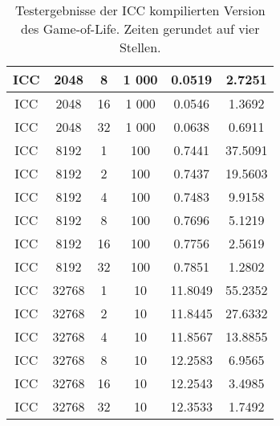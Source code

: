 \documentclass[german,plainarticle,hyperref,utf8]{zihpub}
\begin{document}
\begin{table}
\begin{center}
\begin{tabular}{||c c c c c c||}
				\hline
				ICC      & 2048  & 8         & 1 000       & 0.0519                   & 2.7251                \\
				\hline
				ICC      & 2048  & 16        & 1 000       & 0.0546                  & 1.3692                \\
				\hline
				ICC      & 2048  & 32        & 1 000       & 0.0638                  & 0.6911                \\
				\hline\hline
				ICC      & 8192  & 1         & 100         & 0.7441                   & 37.5091                \\
				\hline
				ICC      & 8192  & 2         & 100         & 0.7437                   & 19.5603                \\
				\hline
				ICC      & 8192  & 4         & 100         & 0.7483                   & 9.9158                \\
				\hline
				ICC      & 8192  & 8         & 100         & 0.7696                   & 5.1219                \\
				\hline
				ICC      & 8192  & 16        & 100         & 0.7756                   & 2.5619                \\
				\hline
				ICC      & 8192  & 32        & 100         & 0.7851                   & 1.2802                \\
				\hline\hline
				ICC      & 32768 & 1         & 10          & 11.8049                   & 55.2352                \\
				\hline
				ICC      & 32768 & 2         & 10          & 11.8445                   & 27.6332                \\
				\hline
				ICC      & 32768 & 4         & 10          & 11.8567                   & 13.8855                \\
				\hline
				ICC      & 32768 & 8         & 10          & 12.2583                   & 6.9565                \\
				\hline
				ICC      & 32768 & 16        & 10          & 12.2543                   & 3.4985                \\
				\hline
				ICC      & 32768 & 32        & 10          & 12.3533                   & 1.7492                \\
				\hline
			\end{tabular}
			\caption{\label{tab:icc}Testergebnisse der ICC kompilierten Version des Game-of-Life. Zeiten gerundet auf vier Stellen.}
		\end{center}
	\end{table}
\end{document}
